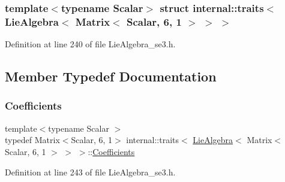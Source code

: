 \subsubsection*{template$<$typename Scalar$>$\newline
struct internal\+::traits$<$ Lie\+Algebra$<$ Matrix$<$ Scalar, 6, 1 $>$ $>$ $>$}



Definition at line 240 of file Lie\+Algebra\+\_\+se3.\+h.



\subsection{Member Typedef Documentation}
\hypertarget{structinternal_1_1traits_3_01_lie_algebra_3_01_matrix_3_01_scalar_00_016_00_011_01_4_01_4_01_4_a24207cc49d00e538b9dac7329edc23e6}{}\label{structinternal_1_1traits_3_01_lie_algebra_3_01_matrix_3_01_scalar_00_016_00_011_01_4_01_4_01_4_a24207cc49d00e538b9dac7329edc23e6} 
\subsubsection{\texorpdfstring{Coefficients}{Coefficients}}
{\footnotesize\ttfamily template$<$typename Scalar $>$ \\
typedef Matrix$<$Scalar, 6, 1$>$ internal\+::traits$<$ \hyperlink{class_lie_algebra}{Lie\+Algebra}$<$ Matrix$<$ Scalar, 6, 1 $>$ $>$ $>$\+::\hyperlink{structinternal_1_1traits_3_01_lie_algebra_3_01_matrix_3_01_scalar_00_016_00_011_01_4_01_4_01_4_a24207cc49d00e538b9dac7329edc23e6}{Coefficients}}



Definition at line 243 of file Lie\+Algebra\+\_\+se3.\+h.

\hypertarget{structinternal_1_1traits_3_01_lie_algebra_3_01_matrix_3_01_scalar_00_016_00_011_01_4_01_4_01_4_a2a6e55a56a1c0c3b97c50cb8598ac55a}{}\label{structinternal_1_1traits_3_01_lie_algebra_3_01_matrix_3_01_scalar_00_016_00_011_01_4_01_4_01_4_a2a6e55a56a1c0c3b97c50cb8598ac55a} 
